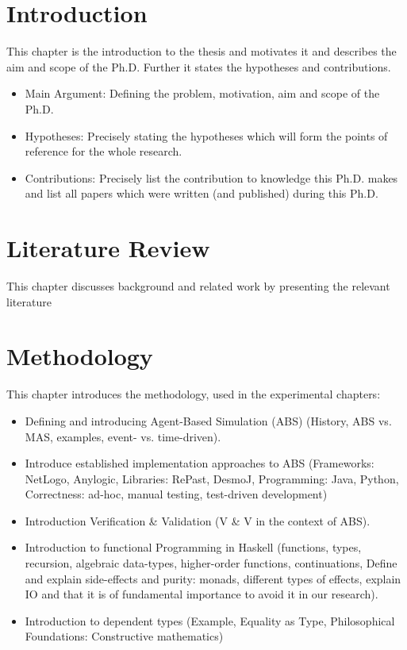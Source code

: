 \section{Introduction}
This chapter is the introduction to the thesis and motivates it and describes the aim and scope of the Ph.D. Further it states the hypotheses and contributions.
\begin{itemize}
	\item Main Argument: Defining the problem, motivation, aim and scope of the Ph.D.
	\item Hypotheses: Precisely stating the hypotheses which will form the points of reference for the whole research.
	\item Contributions: Precisely list the contribution to knowledge this Ph.D. makes and list all papers which were written (and published) during this Ph.D.
\end{itemize}

\section{Literature Review}
This chapter discusses background and related work by presenting the relevant literature 

\section{Methodology}
This chapter introduces the methodology, used in the experimental chapters:

\begin{itemize}
	\item Defining and introducing Agent-Based Simulation (ABS) (History, ABS vs. MAS, examples, event- vs. time-driven).
	\item Introduce established implementation approaches to ABS (Frameworks: NetLogo, Anylogic, Libraries: RePast, DesmoJ, Programming: Java, Python, Correctness: ad-hoc, manual testing, test-driven development)
	\item Introduction Verification \& Validation (V \& V in the context of ABS).
	\item Introduction to functional Programming in Haskell (functions, types, recursion, algebraic data-types, higher-order functions, continuations, Define and explain side-effects and purity: monads, different types of effects, explain IO and that it is of fundamental importance to avoid it in our research).
	\item Introduction to dependent types (Example, Equality as Type, Philosophical Foundations: Constructive mathematics)
\end{itemize}

